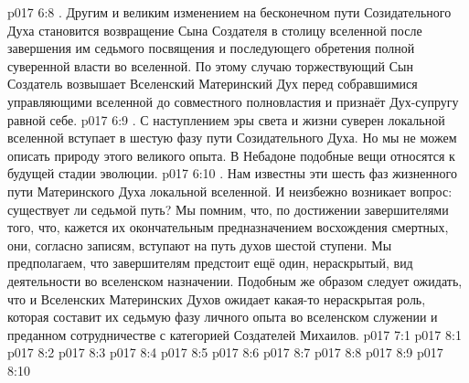 \vs p017 6:8 . Другим и великим изменением на бесконечном пути Созидательного Духа становится возвращение Сына Создателя в столицу вселенной после завершения им седьмого посвящения и последующего обретения полной суверенной власти во вселенной. По этому случаю торжествующий Сын Создатель возвышает Вселенский Материнский Дух перед собравшимися управляющими вселенной до совместного полновластия и признаёт Дух\hyp{}супругу равной себе.
\vs p017 6:9 . С наступлением эры света и жизни суверен локальной вселенной вступает в шестую фазу пути Созидательного Духа. Но мы не можем описать природу этого великого опыта. В Небадоне подобные вещи относятся к будущей стадии эволюции.
\vs p017 6:10 . Нам известны эти шесть фаз жизненного пути Материнского Духа локальной вселенной. И неизбежно возникает вопрос: существует ли седьмой путь? Мы помним, что, по достижении завершителями того, что, кажется их окончательным предназначением восхождения смертных, они, согласно записям, вступают на путь духов шестой ступени. Мы предполагаем, что завершителям предстоит ещё один, нераскрытый, вид деятельности во вселенском назначении. Подобным же образом следует ожидать, что и Вселенских Материнских Духов ожидает какая\hyp{}то нераскрытая роль, которая составит их седьмую фазу личного опыта во вселенском служении и преданном сотрудничестве с категорией Создателей Михаилов.
\vs p017 7:1 
\vs p017 8:1 
\vs p017 8:2 \pc 
\vs p017 8:3 \pc 
\vs p017 8:4 
\vs p017 8:5 
\vs p017 8:6 
\vs p017 8:7 
\vs p017 8:8 
\vs p017 8:9 \pc 
\vsetoff
\vs p017 8:10 
\quizlink
